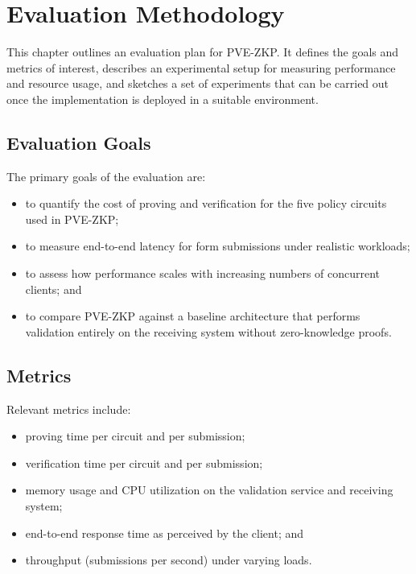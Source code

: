 
\chapter{Evaluation Methodology}

This chapter outlines an evaluation plan for PVE-ZKP. It defines the goals and
metrics of interest, describes an experimental setup for measuring performance
and resource usage, and sketches a set of experiments that can be carried out
once the implementation is deployed in a suitable environment.

\section{Evaluation Goals}

The primary goals of the evaluation are:

\begin{itemize}[leftmargin=*]
  \item to quantify the cost of proving and verification for the five policy
    circuits used in PVE-ZKP;
  \item to measure end-to-end latency for form submissions under realistic
    workloads;
  \item to assess how performance scales with increasing numbers of concurrent
    clients; and
  \item to compare PVE-ZKP against a baseline architecture that performs
    validation entirely on the receiving system without zero-knowledge proofs.
\end{itemize}

\section{Metrics}

Relevant metrics include:

\begin{itemize}[leftmargin=*]
  \item proving time per circuit and per submission;
  \item verification time per circuit and per submission;
  \item memory usage and CPU utilization on the validation service and
    receiving system;
  \item end-to-end response time as perceived by the client; and
  \item throughput (submissions per second) under varying loads.
\end{itemize}

